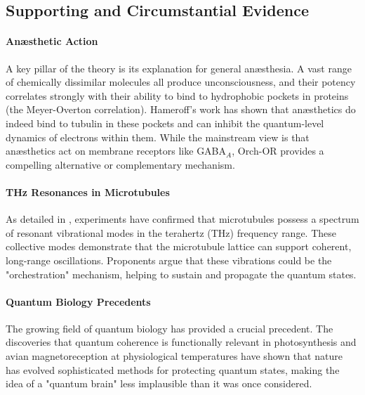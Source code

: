 \subsection{Supporting and Circumstantial Evidence}

\paragraph{Anæsthetic Action}
A key pillar of the theory is its explanation for general anæsthesia. A vast range of chemically dissimilar molecules all produce unconsciousness, and their potency correlates strongly with their ability to bind to hydrophobic pockets in proteins (the Meyer-Overton correlation). Hameroff's work has shown that anæsthetics do indeed bind to tubulin in these pockets and can inhibit the quantum-level dynamics of electrons within them. While the mainstream view is that anæsthetics act on membrane receptors like GABA\(_A\), Orch-OR provides a compelling alternative or complementary mechanism.

\paragraph{THz Resonances in Microtubules}
As detailed in , experiments have confirmed that microtubules possess a spectrum of resonant vibrational modes in the terahertz (THz) frequency range. These collective modes demonstrate that the microtubule lattice can support coherent, long-range oscillations. Proponents argue that these vibrations could be the "orchestration" mechanism, helping to sustain and propagate the quantum states.

\paragraph{Quantum Biology Precedents}
The growing field of quantum biology has provided a crucial precedent. The discoveries that quantum coherence is functionally relevant in photosynthesis and avian magnetoreception at physiological temperatures have shown that nature has evolved sophisticated methods for protecting quantum states, making the idea of a "quantum brain" less implausible than it was once considered.

